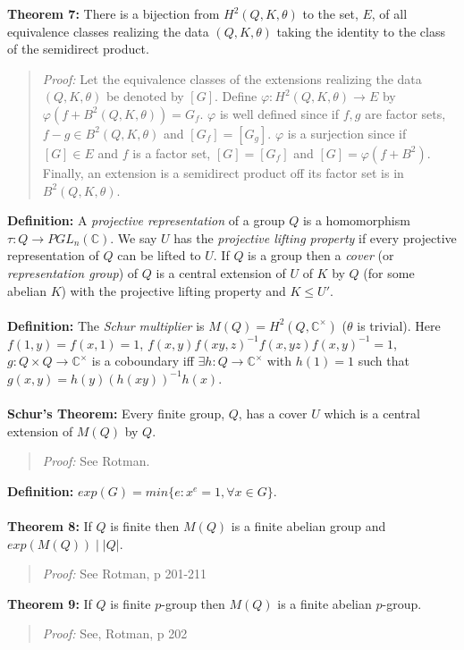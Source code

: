 {\bf Theorem 7:}
There is a bijection from $H^2(Q,K,\theta)$ to the set, $E$, of 
all equivalence classes realizing the data
$(Q, K, \theta )$ taking the identity to the class of the semidirect product.
\begin{quote}
\emph{Proof:}  
Let  the
equivalence classes of the extensions realizing the data
$(Q, K, \theta )$ be denoted by 
$[G]$.  Define $\varphi: H^2(Q, K, \theta ) \rightarrow E $ by $\varphi(f+B^2(Q, K, \theta))= G_f$.
$\varphi$ is well defined since if $f,g$ are factor sets, $f-g \in
B^2(Q, K, \theta )$ and $[G_f]=[G_g]$. $\varphi$ is a surjection since if
$[G] \in E$ and $f$ is a factor set, $[G]=[G_f]$ and $[G]= \varphi(f+B^2)$.  Finally, an extension is a
semidirect product off its factor set is in $B^2(Q,K,\theta)$.
\end{quote}
{\bf Definition:}
A \emph{projective representation} of a group $Q$ is a homomorphism
$\tau: Q \rightarrow PGL_n({\mathbb C})$.
We say $U$ has the \emph{projective lifting property} if every projective representation
of $Q$ can be lifted to $U$.
If $Q$ is a group then a \emph{cover} (or \emph{representation group}) of $Q$ is a
central extension of $U$ of $K$ by $Q$ (for some abelian $K$) with the projective lifting property
and $K \le U'$.
\\
\\
{\bf Definition:}
The \emph {Schur multiplier} is
$M(Q)=H^2 (Q, {\mathbb C}^{\times})$ ($\theta$ is trivial).
Here $f(1,y)=f(x,1)=1$, $f(x,y) f(xy,z)^{-1} f(x,yz) f(x,y)^{-1}=1$,
$g: Q \times Q \rightarrow {\mathbb C}^{\times}$ is a coboundary
iff $\exists h: Q \rightarrow {\mathbb C}^{\times}$ with $h(1)=1$ such that
$g(x,y)= h(y)(h(xy))^{-1}h(x)$.
\\
\\
{\bf Schur's Theorem:} Every finite group, $Q$, has a cover $U$ which is a central extension
of $M(Q)$ by $Q$.
\begin{quote}
\emph{Proof:} See Rotman.
\end{quote}
{\bf Definition:}
$exp(G)= min \{e: x^e = 1, \forall x \in G \}$.
\\
\\
{\bf Theorem 8:} If $Q$ is finite then $M(Q)$ is a finite abelian group and
$exp(M(Q)) \mid |Q|$.
\begin{quote}
\emph{Proof:}  
See Rotman, p 201-211
\end{quote}
{\bf Theorem 9:} If $Q$ is finite $p$-group then $M(Q)$ is a finite abelian $p$-group.
\begin{quote}
\emph{Proof:}  
See, Rotman, p 202
\end{quote}
